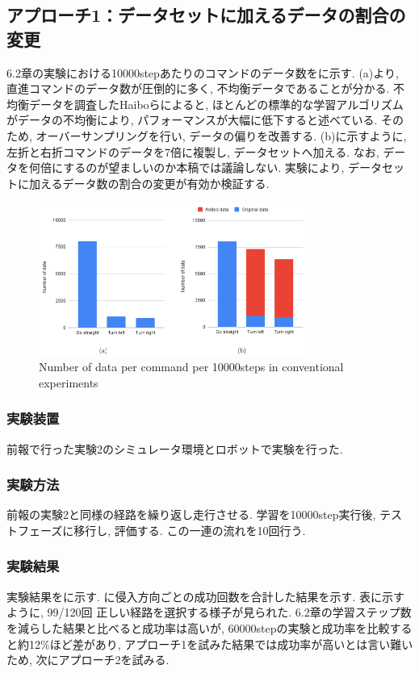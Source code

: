 \documentclass{jarticle}
\begin{document}
\subsection{アプローチ1：データセットに加えるデータの割合の変更}
6.2章の実験における10000stepあたりのコマンドのデータ数をに示す. (a)より, 直進コマンドのデータ数が圧倒的に多く, 不均衡データであることが分かる.
不均衡データを調査したHaiboら\cite{haibo}によると, ほとんどの標準的な学習アルゴリズムがデータの不均衡により, パフォーマンスが大幅に低下すると述べている. そのため, オーバーサンプリングを行い, データの偏りを改善する. (b)に示すように, 左折と右折コマンドのデータを7倍に複製し, データセットへ加える. なお, データを何倍にするのが望ましいのか本稿では議論しない. 実験により, データセットに加えるデータ数の割合の変更が有効か検証する.

\begin{figure}[h]
  \centering
   \includegraphics[width=87mm]{hist.png}
   \vspace*{-6mm}
   \caption{Number of data per command per 10000steps in conventional experiments}
   \label{fig: fig10}
 \end{figure}

\subsubsection{実験装置}
前報\cite{mech}で行った実験2のシミュレータ環境とロボットで実験を行った.

\subsubsection{実験方法}
前報\cite{mech}の実験2と同様の経路を繰り返し走行させる. 学習を10000step実行後, テストフェーズに移行し, 評価する. この一連の流れを10回行う.

\subsubsection{実験結果}
実験結果をに示す. に侵入方向ごとの成功回数を合計した結果を示す. 表に示すように, 99/120回 正しい経路を選択する様子が見られた. 6.2章の学習ステップ数を減らした結果と比べると成功率は高いが, 60000stepの実験と成功率を比較すると約12\%ほど差があり, アプローチ1を試みた結果では成功率が高いとは言い難いため, 次にアプローチ2を試みる.
\end{document}
